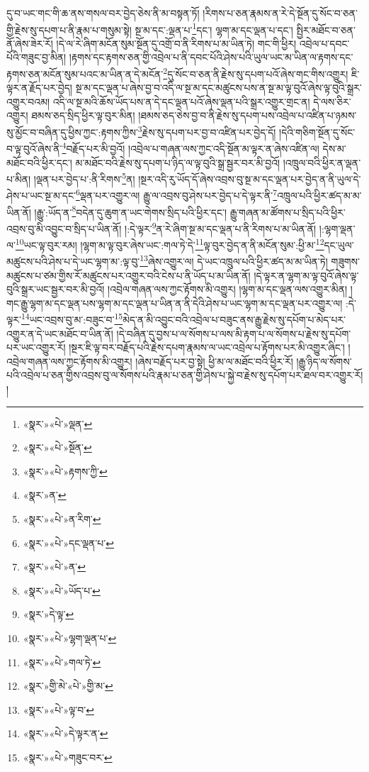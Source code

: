 དུ་བ་ཡང་གང་གི་ཆ་ནས་གསལ་བར་བྱེད་ཅེས་ནི་མ་བསྟན་ཏོ། །རིགས་པ་ཅན་རྣམས་ན་རེ་དེ་སྔོན་དུ་སོང་བ་ཅན་གྱི་རྗེས་སུ་དཔག་པ་ནི་རྣམ་པ་གསུམ་སྟེ། སྔ་མ་དང་:ལྡན་པ་\footnote{«སྣར་»«པེ་»ལྡན་}དང་། ལྷག་མ་དང་ལྡན་པ་དང་། སྤྱིར་མཐོང་བ་ཅན་ནོ་ཞེས་ཟེར་རོ། །དེ་ལ་རེ་ཞིག་མངོན་སུམ་སྔོན་དུ་འགྲོ་བ་ནི་རིགས་པ་མ་ཡིན་ཏེ། གང་གི་ཕྱིར། འབྲེལ་པ་དབང་པོའི་གཟུང་བྱ་མིན། །རྟགས་དང་རྟགས་ཅན་གྱི་འབྲེལ་པ་ནི་དབང་པོའི་ཤེས་པའི་ཡུལ་ཡང་མ་ཡིན་ལ་རྟགས་དང་རྟགས་ཅན་མངོན་སུམ་པའང་མ་ཡིན་ན་དེ་མངོན་\footnote{«སྣར་»«པེ་»སྔོན་}དུ་སོང་བ་ཅན་ནི་རྗེས་སུ་དཔག་པའོ་ཞེས་གང་གིས་འགྱུར། ཇི་ལྟར་ན་རྗོད་པར་བྱེད། སྔ་མ་དང་ལྡན་པ་ཞེས་བྱ་བ་འདི་ལ་སྔ་མ་དང་མཚུངས་པས་ན་སྔ་མ་ལྟ་བུའོ་ཞེས་ལྟ་བུའི་སྒྲར་འགྱུར་བའམ། འདི་ལ་སྔ་མའི་ཆོས་ཡོད་པས་ན་དེ་དང་ལྡན་པའོ་ཞེས་ལྡན་པའི་སྒྲར་འགྱུར་གྲང་ན། དེ་ལས་ཅིར་འགྱུར། ཐམས་ཅད་སྲིད་ཕྱིར་ལྟ་བུར་མིན། །ཐམས་ཅད་ཅེས་བྱ་བ་ནི་རྗེས་སུ་དཔག་པས་འབྲེལ་པ་འཛིན་པ་ཉམས་སུ་མྱོང་བ་བཞིན་དུ་ཕྱིས་ཀྱང་:རྟགས་ཀྱིས་\footnote{«སྣར་»«པེ་»རྟགས་ཀྱི་}རྗེས་སུ་དཔག་པར་བྱ་བ་འཛིན་པར་བྱེད་དོ། །དེའི་གཅིག་སྔོན་དུ་སོང་བ་ལྟ་བུའོ་ཞེས་ནི་\footnote{«སྣར་»ན་}བརྗོད་པར་མི་བྱའོ། །འབྲེལ་པ་གཞན་ལས་ཀྱང་འདི་སྔོན་མ་ལྟར་ན་ཞེས་འཛིན་ལ། དེས་མ་མཐོང་བའི་ཕྱིར་དང་། མ་མཐོང་བའི་རྗེས་སུ་དཔག་པ་ཉིད་ལ་ལྟ་བུའི་སྒྲ་སྦྱར་བར་མི་བྱའོ། །འཁྲུལ་བའི་ཕྱིར་ན་ལྡན་པ་མིན། །ལྡན་པར་བྱེད་པ་:ནི་རིགས་\footnote{«སྣར་»«པེ་»ན་རིག་}ན། །སྔར་འདི་རུ་ཡོད་དོ་ཞེས་འབྲས་བུ་སྔ་མ་དང་ལྡན་པར་བྱེད་ན་ནི་ཡུལ་དེ་ཤེས་པ་ཡང་སྔ་མ་དང་\footnote{«སྣར་»«པེ་»དང་ལྡན་པ་}ལྡན་པར་འགྱུར་ལ། རྒྱུ་ལ་འབྲས་བུ་ཤེས་པར་བྱེད་པ་དེ་ལྟར་ནི་\footnote{«སྣར་»«པེ་»ན་}འཁྲུལ་པའི་ཕྱིར་ཚད་མ་མ་ཡིན་ནོ། །རྒྱུ་:ཡོད་ན་\footnote{«སྣར་»«པེ་»ཡོད་པ་}བདེན་དུ་ཆུག་ན་ཡང་གེགས་སྲིད་པའི་ཕྱིར་དང་། རྒྱུ་གཞན་མ་ཚོགས་པ་སྲིད་པའི་ཕྱིར་འབྲས་བུ་མི་འབྱུང་བ་སྲིད་པ་ཡིན་ནོ། །:དེ་ལྟར་\footnote{«སྣར་»དེ་ལྟ་}ན་རེ་ཞིག་སྔ་མ་དང་ལྡན་པ་ནི་རིགས་པ་མ་ཡིན་ནོ། །:ལྷག་ལྡན་ལ་\footnote{«སྣར་»«པེ་»ལྷག་ལྡན་པ་}ཡང་ལྟ་བུར་རམ། །ལྷག་མ་ལྟ་བུར་ཞེས་ཡང་:གལ་ཏེ་དེ་\footnote{«སྣར་»«པེ་»གལ་ཏེ་}ལྟ་བུར་བྱེད་ན་ནི་མངོན་སུམ་:ཕྱི་མ་\footnote{«སྣར་»གྱི་མེ་«པེ་»གྱི་མ་}དང་ཡུལ་མཚུངས་པའི་ཤེས་པ་དེ་ཡང་ལྷག་མ་:ལྟ་བུ་\footnote{«སྣར་»«པེ་»ལྟ་བ་}ཞེས་འགྱུར་ལ། དེ་ཡང་འཁྲུལ་པའི་ཕྱིར་ཚད་མ་མ་ཡིན་ཏེ། གཟུགས་མཚུངས་པ་ཙམ་གྱིས་རོ་མཚུངས་པར་འགྱུར་བའི་ངེས་པ་ནི་ཡོད་པ་མ་ཡིན་ནོ། །དེ་ལྟར་ན་ལྷག་མ་ལྟ་བུའོ་ཞེས་ལྟ་བུའི་སྒྲར་ཡང་སྦྱར་བར་མི་བྱའོ། །འབྲེལ་གཞན་ལས་ཀྱང་རྟོགས་མི་འགྱུར། །ལྷག་མ་དང་ལྡན་ལས་འགྱུར་མིན། །གང་རྒྱུ་ལྷག་མ་དང་ལྡན་པས་ལྷག་མ་དང་ལྡན་པ་ཡིན་ན་ནི་དེའི་ཤེས་པ་ཡང་ལྷག་མ་དང་ལྡན་པར་འགྱུར་ལ། :དེ་ལྟར་\footnote{«སྣར་»«པེ་»དེ་ལྟར་ན་}ཡང་འབྲས་བུ་མ་:བཟུང་བ་\footnote{«སྣར་»«པེ་»གཟུང་བར་}མེད་ན་མི་འབྱུང་བའི་འབྲེལ་པ་བཟུང་ནས་རྒྱུ་རྗེས་སུ་དཔོག་པ་མེད་པར་འགྱུར་ན་དེ་ཡང་མཐོང་བ་ཡིན་ནོ། །དེ་བཞིན་དུ་བྱས་པ་ལ་སོགས་པ་ལས་མི་རྟག་པ་ལ་སོགས་པ་རྗེས་སུ་དཔོག་པར་ཡང་འགྱུར་རོ། །སྔར་ཇི་ལྟ་བར་བརྗོད་པའི་རྗེས་དཔག་རྣམས་ལ་ཡང་འབྲེལ་པ་རྟོགས་པར་མི་འགྱུར་ཞིང་། །འབྲེལ་གཞན་ལས་ཀྱང་རྟོགས་མི་འགྱུར། །ཞེས་བརྗོད་པར་བྱ་སྟེ། ཕྱི་མ་ལ་མཐོང་བའི་ཕྱིར་རོ། །རྒྱུ་ཉིད་ལ་སོགས་པའི་འབྲེལ་པ་ཅན་གྱིས་འབྲས་བུ་ལ་སོགས་པའི་རྣམ་པ་ཅན་གྱི་ཤེས་པ་སྐྱེ་བ་རྗེས་སུ་དཔོག་པར་ཐལ་བར་འགྱུར་རོ། །
